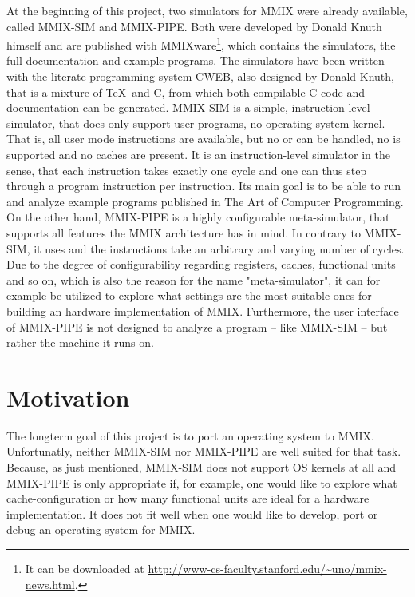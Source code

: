 At the beginning of this project, two simulators for MMIX were already available, called MMIX-SIM and MMIX-PIPE. Both were developed by \gls{Donald Knuth} himself and are published with MMIXware\footnote{It can be downloaded at \url{http://www-cs-faculty.stanford.edu/~uno/mmix-news.html}.}, which contains the simulators, the full documentation and example programs. The simulators have been written with the literate programming system CWEB, also designed by \gls{Donald Knuth}, that is a mixture of \gls{TeX}~and C, from which both compilable C code and documentation can be generated. MMIX-SIM is a simple, instruction-level simulator, that does only support user-programs, \ie no operating system kernel. That is, all user mode instructions are available, but no  or  can be handled, no  is supported and no caches are present. It is an instruction-level simulator in the sense, that each instruction takes exactly one cycle and one can thus step through a program instruction per instruction. Its main goal is to be able to run and analyze example programs published in \gls{The Art of Computer Programming}. \citep[pg. 1]{mmix-sim} On the other hand, MMIX-PIPE is a highly configurable meta-simulator, that supports all features the MMIX architecture has in mind. In contrary to MMIX-SIM, it uses  and the instructions take an arbitrary and varying number of cycles. Due to the degree of configurability regarding registers, caches, functional units and so on, which is also the reason for the name "meta-simulator", it can for example be utilized to explore what settings are the most suitable ones for building an hardware implementation of MMIX. Furthermore, the user interface of MMIX-PIPE is not designed to analyze a program -- like MMIX-SIM -- but rather the machine it runs on.

\section{Motivation}

The longterm goal of this project is to port an operating system to MMIX. Unfortunatly, neither MMIX-SIM nor MMIX-PIPE are well suited for that task. Because, as just mentioned, MMIX-SIM does not support OS kernels at all and MMIX-PIPE is only appropriate if, for example, one would like to explore what cache-configuration or how many functional units are ideal for a hardware implementation. It does not fit well when one would like to develop, port or debug an operating system for MMIX.

